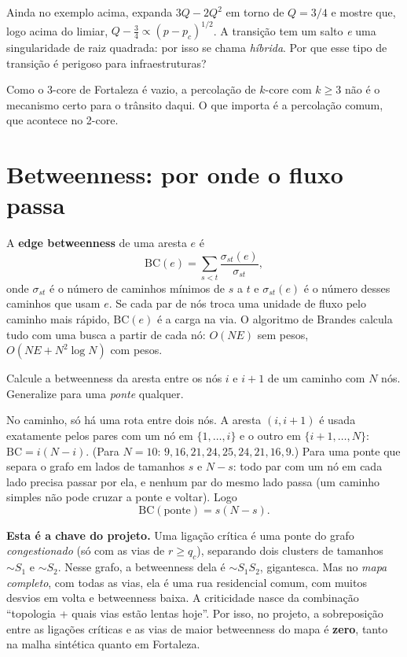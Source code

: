 \documentclass[11pt]{article}
\begin{document}
 Ainda no exemplo acima, expanda $3Q-2Q^2$ em torno de $Q=3/4$ e mostre que, logo acima do limiar, $Q-\tfrac34\propto(p-p_c)^{1/2}$. A transição tem um salto \emph{e} uma singularidade de raiz quadrada: por isso se chama \emph{híbrida}. Por que esse tipo de transição é perigoso para infraestruturas?

\begin{obs}
Como o 3-core de Fortaleza é vazio, a percolação de $k$-core com $k\ge3$ não é o mecanismo certo para o trânsito daqui. O que importa é a percolação comum, que acontece no 2-core.
\end{obs}

\section{Betweenness: por onde o fluxo passa}

\begin{ideia}
A \textbf{edge betweenness} de uma aresta $e$ é
\[
\mathrm{BC}(e) = \sum_{s<t}\frac{\sigma_{st}(e)}{\sigma_{st}},
\]
onde $\sigma_{st}$ é o número de caminhos mínimos de $s$ a $t$ e $\sigma_{st}(e)$ é o número desses caminhos que usam $e$. Se cada par de nós troca uma unidade de fluxo pelo caminho mais rápido, $\mathrm{BC}(e)$ é a carga na via. O algoritmo de Brandes calcula tudo com uma busca a partir de cada nó: $O(NE)$ sem pesos, $O(NE+N^2\log N)$ com pesos.
\end{ideia}

\begin{exemplo}
Calcule a betweenness da aresta entre os nós $i$ e $i+1$ de um caminho com $N$ nós. Generalize para uma \emph{ponte} qualquer.
\end{exemplo}
\begin{solucao}
No caminho, só há uma rota entre dois nós. A aresta $(i,i+1)$ é usada exatamente pelos pares com um nó em $\{1,\dots,i\}$ e o outro em $\{i+1,\dots,N\}$: $\mathrm{BC} = i(N-i)$. (Para $N=10$: $9,16,21,24,25,24,21,16,9$.) Para uma ponte que separa o grafo em lados de tamanhos $s$ e $N-s$: todo par com um nó em cada lado precisa passar por ela, e nenhum par do mesmo lado passa (um caminho simples não pode cruzar a ponte e voltar). Logo
\[
\mathrm{BC}(\text{ponte}) = s(N-s).
\]
\end{solucao}

\begin{ideia}
\textbf{Esta é a chave do projeto.} Uma ligação crítica é uma ponte do grafo \emph{congestionado} (só com as vias de $r\ge q_c$), separando dois clusters de tamanhos $\sim S_1$ e $\sim S_2$. Nesse grafo, a betweenness dela é $\sim S_1S_2$, gigantesca. Mas no \emph{mapa completo}, com todas as vias, ela é uma rua residencial comum, com muitos desvios em volta e betweenness baixa. A criticidade nasce da combinação ``topologia + quais vias estão lentas hoje''. Por isso, no projeto, a sobreposição entre as ligações críticas e as vias de maior betweenness do mapa é \textbf{zero}, tanto na malha sintética quanto em Fortaleza.
\end{ideia}
\end{document}
